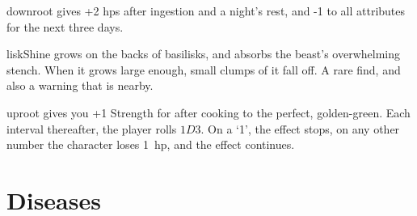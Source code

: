 \begin{multicols}{2}
%
  {downroot}%
  {gives +2 \glspl{hp} after ingestion and a night's rest, and -1 to all \glspl{attribute} for the next three days.
  }

%
  {liskShine}%
  {grows on the backs of \glspl{basilisk}, and absorbs the beast's overwhelming stench.
  When it grows large enough, small clumps of it fall off.
  A rare find, and also a warning that  is nearby.
    }

%
  {uproot}%
  {gives you +1 Strength for  after cooking to the perfect, golden-green.
  Each \gls{interval} thereafter, the player rolls $1D3$.
  On a `1', the effect stops, on any other number the character loses 1~\gls{hp}, and the effect continues.
  }

\end{multicols}

\section[Diseases]{Diseases~}
\label{diseases}
\setcounter{encnum}{0}


